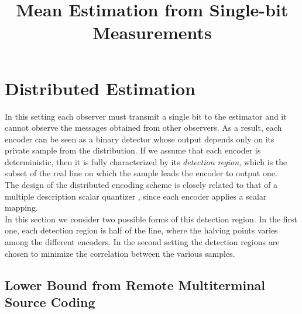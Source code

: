 \documentclass[letterpaper, conference]{IEEEtran}      %
\title{\LARGE \bf Mean Estimation from Single-bit Measurements}
\begin{document}
\graphicspath{{../Figures/}}
\maketitle
\thispagestyle{empty}
\pagestyle{empty}


\section{Distributed Estimation \label{sec:distributed}}

In this setting each observer must transmit a single bit to the estimator and it cannot observe the messages obtained from other observers. As a result, each encoder can be seen as a binary detector whose output depends only on its private sample from the distribution. If we assume that each encoder is deterministic, then it is fully characterized by its \emph{detection region}, which is the subset of the real line on which the sample leads the encoder to output one. \\

The design of the distributed encoding scheme is closely related to that of a multiple description scalar quantizer \cite{vaishampayan1993design}, since each encoder applies a scalar mapping. \\ 

In this section we consider two possible forms of this detection region. In the first one, each detection region is half of the line, where the halving points varies among the different encoders. In the second setting the detection regions are chosen to minimize the correlation between the various samples. 

\subsection{Lower Bound from Remote Multiterminal Source Coding}
\end{document}
